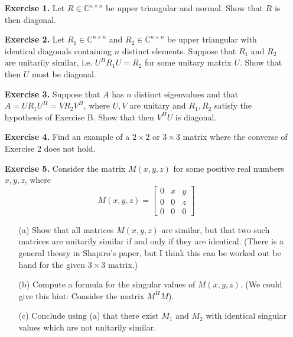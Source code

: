 \documentclass[14pt]{report}
\begin{document}
\begin{enumerate}
  \item[\textbf{Exercise 1.}] Let $R\in\mathbb{C}^{n\times n}$ be upper 
    triangular and normal. Show that $R$ is then diagonal. 

  \item[\textbf{Exercise 2.}] Let $R_1\in\mathbb{C}^{n\times n}$ and
    $R_2\in\mathbb{C}^{n\times n}$ be upper triangular with identical diagonals
    containing $n$ distinct elements. Suppose that $R_1$ and $R_2$ are 
    unitarily similar, i.e. $U^HR_1U = R_2$ for some unitary matrix $U$.
    Show that then $U$ must be diagonal.

  \item[\textbf{Exercise 3.}] Suppose that $A$ has $n$ distinct eigenvalues and
    that $A = U R_1 U^H = V R_2 V^H$, where $U,V$ are unitary and 
    $R_1, R_2$ satisfy the hypothesis of Exercise B. Show that then $V^H U$ is
    diagonal.

  \item[\textbf{Exercise 4.}] Find an example of a $2\times2$ or $3\times3$
    matrix where the converse of Exercise 2 does not hold.

  \item[\textbf{Exercise 5.}] Consider the matrix $M(x,y,z)$ for some positive
    real numbers $x,y,z$, where
  \[M(x,y,z)=\left[\begin{array}{ccc}0&x&y\\0&0&z\\0&0&0\end{array}\right]\]
    \begin{enumerate}
      \item[(a)] Show that all matrices $M(x,y,z)$ are similar, but that two
         such matrices are unitarily similar if and only if they are identical.
        (There is a general theory in Shapiro's paper, but I think this can be
        worked out be hand for the given $3\times3$ matrix.)
      \item[(b)] Compute a formula for the singular values of $M(x,y,z)$. 
        (We could give this hint: Consider the matrix $M^H M$).
      \item[(c)] Conclude using (a) that there exist $M_1$ and $M_2$ with
        identical singular values which are not unitarily similar.
      \end{enumerate}
  

\end{enumerate}
\end{document}

